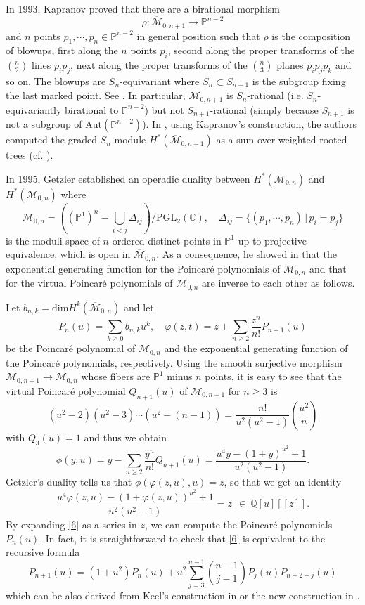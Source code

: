 \documentclass[11pt,letterpaper]{amsart}
\numberwithin{equation}{section}
\theoremstyle{definition}
\newcommand{\PP}{\mathbb{P}}
\def\CC{\mathbb{C}}
\def\QQ{\mathbb{Q}}
\newcommand{\cal}{\mathcal}
\def\cM{{\cal M}}
\def\ocM{\overline{\cM}}
\def\mzn{\overline{\cM}_{0,n} }
\def\dim{\mathrm{dim} }
\def\lra{\longrightarrow }
\def\beq{\begin{equation}}
\def\eeq{\end{equation}}
\begin{document}
In 1993, Kapranov proved that there are a birational morphism
$$\rho:\ocM_{0,n+1}\lra \PP^{n-2}$$
and $n$ points $p_1,\cdots,p_n\in \PP^{n-2}$ in general position such that $\rho$ is the composition of blowups, first along the $n$ points $p_i$, second along the proper transforms of the $\binom{n}{2}$ lines $\overline{p_ip_j}$, next along the proper transforms of the $\binom{n}{3}$ planes $\overline{p_ip_jp_k}$ and so on.
The blowups are $S_n$-equivariant where $S_n\subset S_{n+1}$ is the subgroup fixing the last marked point. See \cite{Kapra}. In particular, $\ocM_{0,n+1}$ is $S_n$-rational (i.e. $S_n$-equivariantly birational to $\PP^{n-2}$) but not $S_{n+1}$-rational (simply because $S_{n+1}$ is not a subgroup of $\mathrm{Aut}(\PP^{n-2})$).
In \cite[\S5]{CKL1}, using Kapranov's construction, the authors computed the graded $S_n$-module $H^*(\ocM_{0,n+1})$ as a sum over weighted rooted trees (cf. \cite[Proposition 5.12]{CKL1}).

In 1995, Getzler established an operadic duality between $H^*(\mzn)$ and $H^*(\cM_{0,n})$ where
\[ \cM_{0,n} = \left( (\PP^1)^n-\bigcup_{i<j}\Delta_{ij}\right)/\mathrm{PGL}_2(\CC), \quad   \Delta_{ij}=\{(p_1,\cdots,p_n)\,|\,p_i=p_j\}\]
is the moduli space of $n$ ordered distinct points in $\PP^1$ up to projective equivalence, which is open in $\mzn$.
As a consequence, he showed in \cite{Getzler} that the exponential generating function for the Poincar\'e polynomials of $\mzn$ and that for the virtual Poincar\'e polynomials of $\cM_{0,n}$ are inverse to each other as follows.

Let $b_{n,k}=\dim H^k(\mzn)$ and let
\beq\label{5} P_n(u)=\sum_{k\ge 0} b_{n,k}u^k, \quad \varphi(z,t)=z+\sum_{n\ge 2}\frac{z^n}{n!}P_{n+1}(u)\eeq
be the Poincar\'e polynomial of $\mzn$ and the exponential generating function of the Poincar\'e polynomials, respectively.
Using the smooth surjective morphism $\cM_{0,n+1}\to \cM_{0,n}$ whose fibers are $\PP^1$ minus $n$ points, it is easy to see that the virtual Poincar\'e polynomial $Q_{n+1}(u)$ of $\cM_{0,n+1}$ for $n\ge 3$ is
\[ (u^2-2)(u^2-3)\cdots (u^2-(n-1))=\frac{n!}{u^2(u^2-1)}\binom{u^2}{n}\]
with $Q_3(u)=1$ and thus we obtain
\[\phi(y,u)=y-\sum_{n\ge 2}\frac{y^n}{n!}Q_{n+1}(u)=\frac{u^4y-(1+y)^{u^2}+1}{u^2(u^2-1)}.\]
Getzler's duality tells us that $\phi(\varphi(z,u),u)=z$, so that we get an identity
\beq\label{6}
\frac{u^4\varphi(z,u)-(1+\varphi(z,u))^{u^2}+1}{u^2(u^2-1)}=z \ \ \in \ \QQ[u][\![z]\!].
\eeq
By expanding \eqref{6} as a series in $z$, we can compute the Poincar\'e polynomials $P_n(u)$.
In fact, it is straightforward to check that \eqref{6} is equivalent to the recursive formula
\beq\label{8}
P_{n+1}(u)=(1+u^2)P_n(u)+u^2\sum_{j=3}^{n-1}\binom{n-1}{j-1}P_j(u)P_{n+2-j}(u)
\eeq
which can be also derived from Keel's construction in \cite{Keel} or the new construction in \cite{CK0}.
\end{document}
